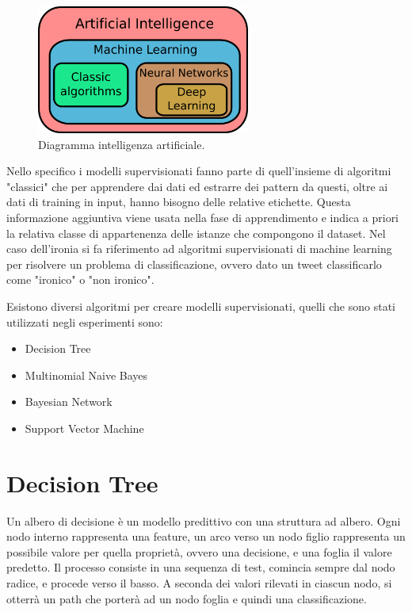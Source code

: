 \documentclass[oneside]{book}
\begin{document}
\begin{figure}[!h]
	\centering
	\includegraphics[width=7cm]{assets/ai_diagram.png}
	\caption[Caption for LOF]{Diagramma intelligenza artificiale.\footnotemark}
	\label{fig:artificial-intelligence}
\end{figure}


Nello specifico i modelli supervisionati fanno parte di quell'insieme di algoritmi "classici" che per apprendere dai dati ed estrarre dei pattern da questi, oltre ai dati di training in input, hanno bisogno delle relative etichette. Questa informazione aggiuntiva viene usata nella fase di apprendimento e indica a priori la relativa classe di appartenenza delle istanze che compongono il dataset. Nel caso dell'ironia si fa riferimento ad algoritmi supervisionati di machine learning per risolvere un problema di classificazione, ovvero dato un tweet classificarlo come "ironico" o "non ironico".

Esistono diversi algoritmi per creare modelli supervisionati, quelli che sono stati utilizzati negli esperimenti sono:
\begin{itemize}
	\item Decision Tree
	\item Multinomial Naive Bayes
	\item Bayesian Network
	\item Support Vector Machine
\end{itemize}

\section{Decision Tree}
Un albero di decisione è un modello predittivo con una struttura ad albero. Ogni nodo interno rappresenta una feature, un arco verso un nodo figlio rappresenta un possibile valore per quella proprietà, ovvero una decisione, e una foglia il valore predetto. Il processo consiste in una sequenza di test, comincia sempre dal nodo radice, e procede verso il basso. A seconda dei valori rilevati in ciascun nodo, si otterrà un path che porterà ad un nodo foglia e quindi una classificazione.
\end{document}
